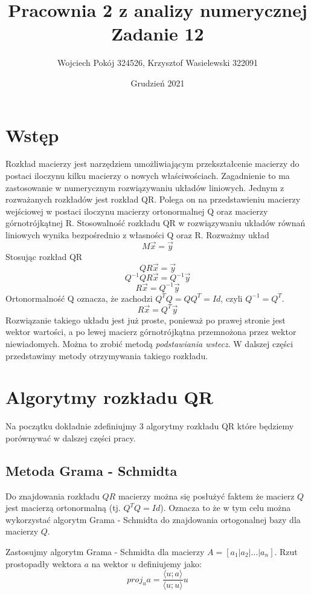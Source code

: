 \documentclass[11pt,wide]{mwart}
\title{\LARGE\textbf{Pracownia 2 z analizy numerycznej}\\Zadanie 12}
\author{Wojciech Pokój 324526, Krzysztof Wasielewski 322091}
\date{Grudzień 2021}
\begin{document}
\maketitle

\section{Wstęp}
Rozkład macierzy jest narzędziem umożliwiającym przekształcenie macierzy do postaci iloczynu kilku macierzy o nowych właściwościach. Zagadnienie to ma zastosowanie w numerycznym rozwiązywaniu układów liniowych. Jednym z rozważanych rozkładów jest rozkład QR. Polega on na przedstawieniu macierzy wejściowej w postaci iloczynu macierzy ortonormalnej Q oraz macierzy górnotrójkątnej R. Stosowalność rozkładu QR w rozwiązywaniu układów równań liniowych wynika bezpośrednio z własności Q oraz R. Rozważmy układ
$$M\vec{x} = \vec{y}$$
Stosując rozkład QR
$$QR\vec{x} = \vec{y}$$
$$Q^{-1}QR\vec{x}=Q^{-1}\vec{y} $$
$$R\vec{x}=Q^{-1}\vec{y} $$
Ortonormalność Q oznacza, że zachodzi $Q^TQ=QQ^T=Id$, czyli $Q^{-1}=Q^T$. 
$$R\vec{x}=Q^T\vec{y}$$
Rozwiązanie takiego układu jest już proste, ponieważ po prawej stronie jest wektor wartości, a po lewej macierz górnotrójkątna przemnożona przez wektor niewiadomych. Można to zrobić metodą \textit{podstawiania wstecz}. 
W dalszej części przedstawimy metody otrzymywania takiego rozkładu.

\section{Algorytmy rozkładu QR}

Na początku dokładnie zdefiniujmy 3 algorytmy rozkładu QR które będziemy porównywać w dalszej części pracy.

\subsection{Metoda Grama - Schmidta}

Do znajdowania rozkładu $QR$ macierzy można się posłużyć faktem że macierz $Q$ jest macierzą ortonormalną (tj. $Q^TQ = Id$). Oznacza to że w tym celu można wykorzystać algorytm Grama - Schmidta do znajdowania ortogonalnej bazy dla macierzy $Q$.

Zastosujmy algorytm Grama - Schmidta dla macierzy $A = [ a_1 | a_2 | \dots | a_n]$.
Rzut prostopadły wektora $a$ na wektor $u$ definiujemy jako:
\begin{equation}
    proj_ua = \frac{\langle u ; a \rangle}{\langle u ; u \rangle} u
\end{equation}
\end{document}
